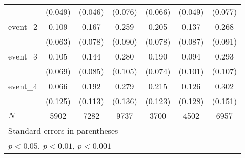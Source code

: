 {\begin{tabular}{l*{6}{c}}
            &     (0.049)         &     (0.046)         &     (0.076)         &     (0.066)         &     (0.049)         &     (0.077)         \\
[1em]
event\_2     &       0.109         &       0.167\sym{*}  &       0.259\sym{**} &       0.205\sym{**} &       0.137         &       0.268\sym{**} \\
            &     (0.063)         &     (0.078)         &     (0.090)         &     (0.078)         &     (0.087)         &     (0.091)         \\
[1em]
event\_3     &       0.105         &       0.144         &       0.280\sym{**} &       0.190\sym{*}  &       0.094         &       0.293\sym{**} \\
            &     (0.069)         &     (0.085)         &     (0.105)         &     (0.074)         &     (0.101)         &     (0.107)         \\
[1em]
event\_4     &       0.066         &       0.192         &       0.279\sym{*}  &       0.215         &       0.126         &       0.302\sym{*}  \\
            &     (0.125)         &     (0.113)         &     (0.136)         &     (0.123)         &     (0.128)         &     (0.151)         \\
\hline
\(N\)       &        5902         &        7282         &        9737         &        3700         &        4502         &        6957         \\
\hline\hline
\multicolumn{7}{l}{\footnotesize Standard errors in parentheses}\\
\multicolumn{7}{l}{\footnotesize \sym{*} \(p<0.05\), \sym{**} \(p<0.01\), \sym{***} \(p<0.001\)}\\
\end{tabular}
}
